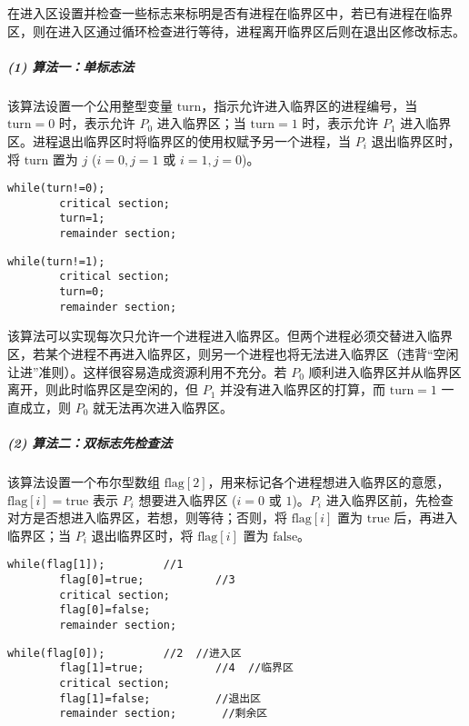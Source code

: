 \documentclass{ctexbook}
\begin{document}
	在进入区设置并检查一些标志来标明是否有进程在临界区中，若已有进程在临界区，则在进入区通过循环检查进行等待，进程离开临界区后则在退出区修改标志。
	
	\subparagraph{(1) 算法一：单标志法}
	
	该算法设置一个公用整型变量 $\text{turn}$，指示允许进入临界区的进程编号，当 $\text{turn}=0$ 时，表示允许 $P_0$ 进入临界区；当 $\text{turn}=1$ 时，表示允许 $P_1$ 进入临界区。进程退出临界区时将临界区的使用权赋予另一个进程，当 $P_i$ 退出临界区时，将 $\text{turn}$ 置为 $j$ ($i=0, j=1$ 或 $i=1, j=0$)。
	
	\begin{lstlisting}[caption={进程 P0}, label={lst:p0}]
		while(turn!=0);
		critical section;
		turn=1;
		remainder section;
	\end{lstlisting}
	
	\begin{lstlisting}[caption={进程 P1}, label={lst:p1}]
		while(turn!=1);
		critical section;
		turn=0;
		remainder section;
	\end{lstlisting}
	
	该算法可以实现每次只允许一个进程进入临界区。但两个进程必须交替进入临界区，若某个进程不再进入临界区，则另一个进程也将无法进入临界区（违背“空闲让进”准则）。这样很容易造成资源利用不充分。若 $P_0$ 顺利进入临界区并从临界区离开，则此时临界区是空闲的，但 $P_1$ 并没有进入临界区的打算，而 $\text{turn}=1$ 一直成立，则 $P_0$ 就无法再次进入临界区。
	
	\subparagraph{(2) 算法二：双标志先检查法}
	
	该算法设置一个布尔型数组 $\text{flag}[2]$，用来标记各个进程想进入临界区的意愿，$\text{flag}[i]=\text{true}$ 表示 $P_i$ 想要进入临界区 ($i=0$ 或 $1$)。$P_i$ 进入临界区前，先检查对方是否想进入临界区，若想，则等待；否则，将 $\text{flag}[i]$ 置为 $\text{true}$ 后，再进入临界区；当 $P_i$ 退出临界区时，将 $\text{flag}[i]$ 置为 $\text{false}$。
	
	\begin{lstlisting}[caption={进程 P0}, label={lst:p0}]
		while(flag[1]);         //1
		flag[0]=true;           //3
		critical section;
		flag[0]=false;
		remainder section;
	\end{lstlisting}
	
	\begin{lstlisting}[caption={进程 P1}, label={lst:p1}]
		while(flag[0]);         //2  //进入区
		flag[1]=true;           //4  //临界区
		critical section;
		flag[1]=false;          //退出区
		remainder section;       //剩余区
	\end{lstlisting}
	
\end{document}
